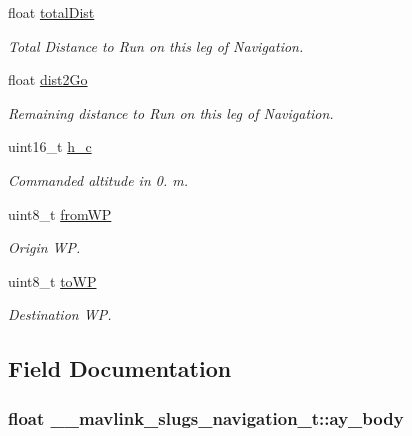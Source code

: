 \begin{DoxyCompactItemize}
float \hyperlink{struct____mavlink__slugs__navigation__t_aa7919499d2cfe0aeed224f25c04d549a}{total\+Dist}
\begin{DoxyCompactList}\small\item\em Total Distance to Run on this leg of Navigation. \end{DoxyCompactList}\item 
float \hyperlink{struct____mavlink__slugs__navigation__t_a86b9f19b0ba5008f6ccab9490f2c3c8e}{dist2\+Go}
\begin{DoxyCompactList}\small\item\em Remaining distance to Run on this leg of Navigation. \end{DoxyCompactList}\item 
uint16\+\_\+t \hyperlink{struct____mavlink__slugs__navigation__t_a3277ba90234007d18d1b793fa72d20a3}{h\+\_\+c}
\begin{DoxyCompactList}\small\item\em Commanded altitude in 0. m. \end{DoxyCompactList}\item 
uint8\+\_\+t \hyperlink{struct____mavlink__slugs__navigation__t_ae52976fa7c429993164d1392ed9956a2}{from\+W\+P}
\begin{DoxyCompactList}\small\item\em Origin W\+P. \end{DoxyCompactList}\item 
uint8\+\_\+t \hyperlink{struct____mavlink__slugs__navigation__t_a4a3cf06f1705640c263d695c2bb71cd3}{to\+W\+P}
\begin{DoxyCompactList}\small\item\em Destination W\+P. \end{DoxyCompactList}\end{DoxyCompactItemize}


\subsection{Field Documentation}
\hypertarget{struct____mavlink__slugs__navigation__t_a0d4a61770f5b61d3f19fcaf3380db8f3}{
\subsubsection[{ay\+\_\+body}]{\setlength{\rightskip}{0pt plus 5cm}float \+\_\+\+\_\+mavlink\+\_\+slugs\+\_\+navigation\+\_\+t\+::ay\+\_\+body}}\label{struct____mavlink__slugs__navigation__t_a0d4a61770f5b61d3f19fcaf3380db8f3}


